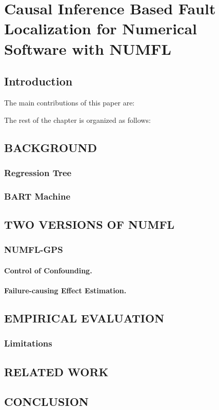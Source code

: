 \chapter{Causal Inference Based Fault Localization for Numerical Software with NUMFL}\label{chap:NUMFL}


\section{Introduction}\label{introduction}
\vspace{-2pt}


The main contributions of this paper are:

The rest of the chapter is organized as follows: 

\section{BACKGROUND}\label{background}%
\subsection{Regression Tree}\label{IIIA}



\subsection{BART Machine}\label{IIIB}



\section{TWO VERSIONS OF NUMFL}\label{twoversion}%


\subsection{NUMFL-GPS}\label{IVA}


\subsubsection{Control of Confounding.}



\subsubsection{Failure-causing Effect Estimation.}



\section{EMPIRICAL EVALUATION}\label{evaluation}%


\subsection{Limitations}


\section{RELATED WORK}\label{relatedwork}


\section{CONCLUSION}\label{conclusion}
